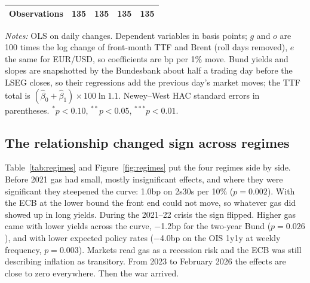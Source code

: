 \documentclass[11pt,a4paper]{article}
\begin{document}
\begin{table}[htbp]
\begin{tabular}{@{}l*{4}{c}@{}}
Observations & 135 & 135 & 135 & 135\\
\bottomrule
\end{tabular}
\par\vspace{4pt}\begin{minipage}{0.94\textwidth}\scriptsize\textit{Notes:} OLS on daily changes. Dependent variables in basis points; $g$ and $o$ are 100 times the log change of front-month TTF and Brent (roll days removed), $e$ the same for EUR/USD, so coefficients are bp per 1\% move. Bund yields and slopes are snapshotted by the Bundesbank about half a trading day before the LSEG closes, so their regressions add the previous day's market moves; the TTF total is $(\hat\beta_0+\hat\beta_1)\times 100\ln 1.1$. Newey--West HAC standard errors in parentheses. $^{*}p<0.10$, $^{**}p<0.05$, $^{***}p<0.01$.\end{minipage}
\end{table}

\subsection{The relationship changed sign across regimes}

Table~\ref{tab:regimes} and Figure~\ref{fig:regimes} put the four regimes side by side. Before 2021 gas had small,
mostly insignificant effects, and where they were significant they steepened the curve: 1.0bp on 2s30s per 10\%
($p=0.002$). With the ECB at the lower bound the front end could not move, so whatever gas did showed up in long
yields. During the 2021--22 crisis the sign flipped. Higher gas came with lower yields across the curve, $-$1.2bp for the
two-year Bund ($p=0.026$), and with lower expected policy rates ($-$4.0bp on the OIS 1y1y at weekly frequency,
$p=0.003$). Markets read gas as a recession risk and the ECB was still describing inflation as transitory. From 2023
to February 2026 the effects are close to zero everywhere. Then the war arrived.
\end{document}
